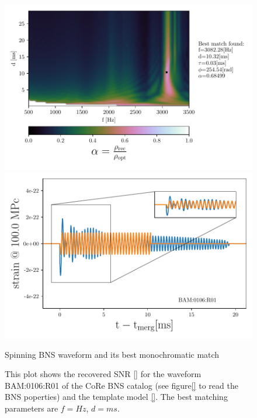\begin{figure}[!htbp]
\begin{center}
\begin{minipage}[t]{0.5\linewidth}
\vspace{0pt}
\includegraphics[scale=0.6,trim={2mm 0 35mm 0},clip]{images/Data_analysis/results/2D_grid_5.pdf}
\end{minipage}%
\begin{minipage}[t]{0.5\linewidth}
\vspace{20pt}
\includegraphics[scale=0.45]{images/Data_analysis/results/2D_grid_6.pdf}
\end{minipage}
\captionsetup{width=0.8\textwidth}
\caption{Spinning BNS waveform and its best monochromatic match}
\caption*{This plot shows the recovered SNR \ref{} for the waveform BAM:0106:R01 of the CoRe BNS catalog \cite{}(see figure\ref{} to read the BNS poperties) and the template model \ref{}. The best matching parameters are $f=Hz$, $d=ms$.}
\end{center}
\end{figure}

